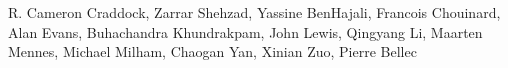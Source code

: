 R. Cameron Craddock, Zarrar Shehzad, Yassine BenHajali, Francois Chouinard, Alan Evans, Buhachandra Khundrakpam, John Lewis, Qingyang Li, Maarten Mennes, Michael Milham, Chaogan Yan, Xinian Zuo, Pierre Bellec

